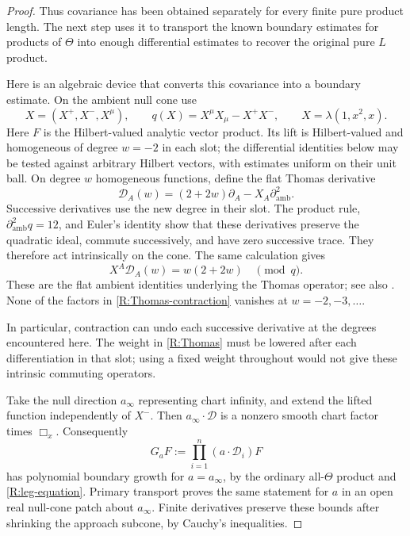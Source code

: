 \begin{proof}
Thus covariance has been obtained separately for every finite pure
product length.  The next step uses it to transport the known
boundary estimates for products of $\Theta$ into enough differential
estimates to recover the original pure $L$ product.

Here is an algebraic device that converts this covariance into a
boundary estimate.  On the ambient null cone use
\[
 X=(X^+,X^-,X^\mu),\qquad q(X)=X^\mu X_\mu-X^+X^-,
 \qquad X=\lambda(1,x^2,x).
\]
Here $F$ is the Hilbert-valued analytic vector product.  Its lift is
Hilbert-valued and homogeneous of degree $w=-2$ in each slot;
the differential identities below may be tested against arbitrary
Hilbert vectors, with estimates uniform on their unit ball.  On degree
$w$ homogeneous functions, define the flat Thomas derivative
\begin{equation}\label{R:Thomas}
 \mathscr D_A(w)=(2+2w)\partial_A-X_A\partial^2_{\mathrm{amb}}.
\end{equation}
Successive derivatives use the new degree in their slot.  The product
rule, $\partial^2_{\mathrm{amb}}q=12$, and Euler's identity show that
these derivatives preserve the quadratic ideal, commute successively,
and have zero successive trace.  They therefore act intrinsically on
the cone.  The same calculation gives
\begin{equation}\label{R:Thomas-contraction}
 X^A\mathscr D_A(w)=w(2+2w)\quad\pmod{q}.
\end{equation}
These are the flat ambient identities underlying the Thomas operator;
see also \cite{GoverWaldron2009}.  None of the factors in
\eqref{R:Thomas-contraction} vanishes at $w=-2,-3,\ldots$.

In particular, contraction can undo each successive derivative at
the degrees encountered here.  The weight in
\eqref{R:Thomas} must be lowered after each differentiation in that
slot; using a fixed weight throughout would not give these intrinsic
commuting operators.

Take the null direction $a_\infty$ representing chart infinity, and
extend the lifted function independently of $X^-$.  Then
$a_\infty\cdot\mathscr D$ is a nonzero smooth chart factor times
$\Box_x$.  Consequently
\begin{equation}\label{R:all-slot-derivative}
 G_aF:=\prod_{i=1}^n(a\cdot\mathscr D_i)F
\end{equation}
has polynomial boundary growth for $a=a_\infty$, by the ordinary
all-$\Theta$ product and \eqref{R:leg-equation}.  Primary transport
proves the same statement for $a$ in an open real null-cone patch about
$a_\infty$.  Finite derivatives preserve these bounds after shrinking
the approach subcone, by Cauchy's inequalities.


\end{proof}
